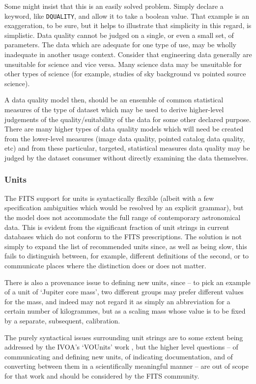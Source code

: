 \documentclass[final,authoryear,5p,times,twocolumn]{elsarticle}
\begin{document}
Some might insist that this is an easily solved problem. Simply
declare a keyword, like \texttt{DQUALITY}, and allow it to take a boolean
value. That example is an exaggeration, to be sure, but it helps to
illustrate that simplicity in this regard, is simplistic. Data quality
cannot be judged on a single, or even a small set, of parameters. The
data which are adequate for one type of use, may be wholly inadequate
in another usage context. Consider that engineering data generally are
unsuitable for science and vice versa. Many science data may be
unsuitable for other types of science (for example, studies of sky
background vs pointed source science).


A data quality model then, should be an ensemble of common statistical
measures of the type of dataset which may be used to derive
higher-level judgements of the quality/suitability of the data for
some other declared purpose. There are many higher types of data
quality models which will need be created from the lower-level
measures (image data quality, pointed catalog data quality, etc) and
from these particular, targeted, statistical measures data quality may
be judged by the dataset consumer without directly examining the data
themselves.


\subsubsection{Units}


The FITS support for units is syntactically flexible (albeit with
a few specification ambiguities which would be resolved by an explicit
grammar), but the model does not accommodate the full range of
contemporary astronomical data.  This is evident from the significant
fraction of unit strings in current databases which do not conform to
the FITS prescriptions.  The solution is not simply to expand the list
of recommended units since, as well as being slow, this fails to
distinguish between, for example, different definitions of the second,
or to communicate places where the distinction does or does not
matter.

There is also a provenance issue to defining new units, since -- to
pick an example of a unit of `Jupiter core mass', two different
groups may prefer different values for the mass, and indeed may not
regard it as simply an abbreviation for a certain number of
kilogrammes, but as a scaling mass whose value is to be fixed by a
separate, subsequent, calibration.

The purely syntactical issues surrounding unit strings are to some
extent being addressed by the IVOA's `VOUnits' work \citep{VOUnits}, but the higher
level questions -- of communicating and defining new units, of
indicating documentation, and of converting between them in a
scientifically meaningful manner -- are out of scope for that work and
should be considered by the FITS community.
\end{document}
